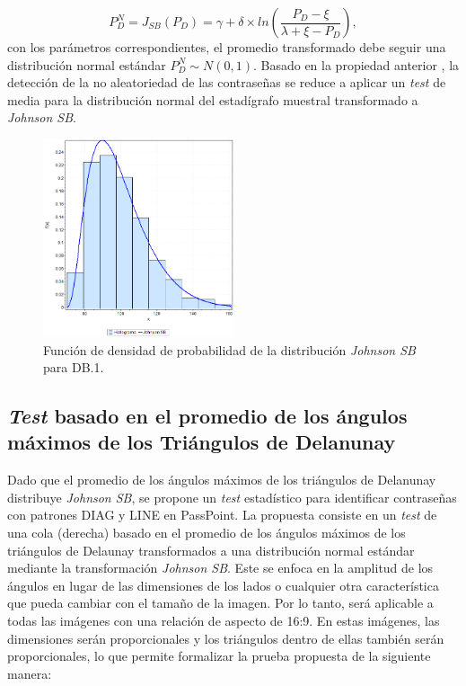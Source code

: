 \documentclass[12pt]{report}
\begin{document}
	  
	 \[
	 P_D^{N} = J_{SB}(P_D) = \gamma + \delta \times ln\left(\frac{P_D - \xi}{\lambda + \xi - P_D}\right),
	 \]
	 con los parámetros correspondientes, el promedio transformado debe seguir una distribución normal estándar $P_D^{N}\sim N(0,1)$. Basado en la propiedad anterior , la detección de la no aleatoriedad de las contraseñas se reduce a aplicar un \textit{test} de media para la distribución normal del estadígrafo muestral transformado a \textit{Johnson SB}.
	 \begin{figure}[ht]
	 	\centering
	 	
	 	\includegraphics[width=0.5\textwidth]{3td_fdp.png}
	 	\caption{Función de densidad de probabilidad de la  distribución \textit{Johnson SB} para DB.1.}
	 	\label{3TD_FDP}
	 \end{figure}
	 
	 
\subsection{\textit{Test} basado en el promedio de los ángulos máximos de los Triángulos de Delanunay}
Dado  que el promedio de los ángulos máximos de los triángulos de Delanunay distribuye \textit{Johnson SB}, se propone un  \textit{test} estadístico para identificar contraseñas con patrones DIAG y LINE en PassPoint. La propuesta consiste en un \textit{test} de una cola (derecha) basado en el promedio de los ángulos máximos de los triángulos de Delaunay transformados a una distribución normal estándar mediante la transformación \textit{Johnson SB}.
Este se enfoca en la amplitud de los ángulos en lugar de las dimensiones de los lados o cualquier otra característica que pueda cambiar con el tamaño de la imagen. Por lo tanto, será aplicable a todas las imágenes con una relación de aspecto de 16:9. En estas imágenes, las dimensiones serán proporcionales y los triángulos dentro de ellas también serán proporcionales, lo que permite formalizar la prueba propuesta de la siguiente manera:
\end{document}
